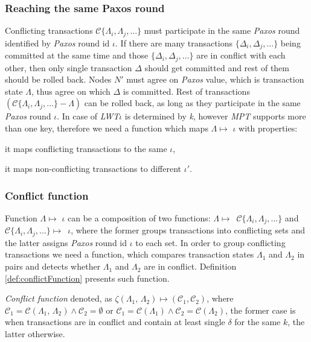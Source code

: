 \documentclass[runningheads,a4paper]{llncs}
\newcommand{\nodesTx}{$\mathit{N'}$\xspace}
\newcommand{\transaction}{$\Delta$\xspace}
\newcommand{\transactions}{$\{\Delta_{i}, \Delta_{j}, ...\}$\xspace}
\newcommand{\txStates}{$\{\Lambda_{i}, \Lambda_{j}, ...\}$\xspace}
\newcommand{\conflictingTxSet}{$\mathcal{C}\text{\txStates}$\xspace}
\newcommand{\paxosRoundId}{$\iota$\xspace}
\newcommand{\txState}{$\Lambda$\xspace}
\newcommand{\txStateOne}{$\Lambda_1$\xspace}
\newcommand{\txStateTwo}{$\Lambda_2$\xspace}
\newcommand{\paxos}{\emph{Paxos}\xspace}
\newcommand{\mpt}{\emph{MPT}\xspace}
\newcommand{\lwt}{\emph{LWT}\xspace}
\begin{document}
\subsubsection{Reaching the same Paxos round}

Conflicting transactions \conflictingTxSet must participate in the same \paxos round identified by \paxos round id \paxosRoundId. If there are many transactions \transactions being committed at the same time and those \transactions are in conflict with each other, then only single transaction \transaction should get committed and rest of them should be rolled back. Nodes \nodesTx must agree on \paxos value, which is transaction state \txState, thus agree on which \transaction is committed. Rest of transactions $(\mathcal{C}\text{\txStates} - \text{\txState})$ can be rolled back, as long as they participate in the same \paxos round \paxosRoundId. In case of \lwt \paxosRoundId is determined by \emph{k}, however \mpt supports more than one key, therefore we need a function which maps \txState $\mapsto $ \paxosRoundId with properties: 
\begin{enumerate*}[label=\alph*)]
  \item it maps conflicting transactions to the same \paxosRoundId,
  \item it maps non-conflicting transactions to different $\iota'$.
\end{enumerate*}

\subsubsection{Conflict function}

Function \txState $\mapsto $ \paxosRoundId can be a composition of two functions: \mbox{\txState $\mapsto $ \conflictingTxSet} and \mbox{\conflictingTxSet $\mapsto$ \paxosRoundId}, where the former groups transactions into conflicting sets and the latter assigns \paxos round id \paxosRoundId to each set. In order to group conflicting transactions we need a function, which compares transaction states \txStateOne and \txStateTwo in pairs and detects whether \txStateOne and \txStateTwo are in conflict. Definition \ref{def:conflictFunction} presents such function.

\begin{definition}
  \label{def:conflictFunction}
  \emph{Conflict function} denoted, as $\zeta (\text{\txStateOne, \txStateTwo}) \mapsto ( \mathcal{C}_1, \mathcal{C}_2)$, where $\mathcal{C}_1 = \mathcal{C}(\text{\txStateOne, \txStateTwo}) \wedge \mathcal{C}_2 = \emptyset $ or $\mathcal{C}_1 = \mathcal{C}(\text{\txStateOne}) \wedge \mathcal{C}_2=\mathcal{C}(\text{\txStateTwo})$, the former case is when transactions are in conflict and contain at least single $\delta$ for the same $k$, the latter otherwise.
\end{definition}
 
\end{document}
